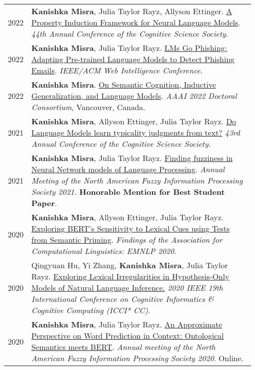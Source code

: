 \documentclass[11pt]{article}
\begin{document}
\begin{longtable}{p{}  p{} }
2022 & \textbf{Kanishka Misra}, Julia Taylor Rayz, Allyson Ettinger. \href{https://escholarship.org/uc/item/6170h6nj}{A Property Induction Framework for Neural Language Models}. \textit{44th Annual Conference of the Cognitive Science Society}.\\

2022 & \textbf{Kanishka Misra}, Julia Taylor Rayz. \href{https://ieeexplore.ieee.org/document/10101955}{LMs Go Phishing: Adapting Pre-trained Language Models to Detect Phishing Emails}. \textit{IEEE/ACM Web Intelligence Conference}.\\

2022 & \textbf{Kanishka Misra}. \href{https://ojs.aaai.org/index.php/AAAI/article/view/21584}{On Semantic Cognition, Inductive Generalization, and Language Models}. \textit{AAAI 2022 Doctoral Consortium}, Vancouver, Canada.\\

2021 & \textbf{Kanishka Misra}, Allyson Ettinger, Julia Taylor Rayz. \href{https://escholarship.org/uc/item/9n77r9mr#main}{Do Language Models learn typicality judgments from text?} \textit{43rd Annual Conference of the Cognitive Science Society.}\\

2021 & \textbf{Kanishka Misra}, Julia Taylor Rayz. \href{http://kanishka.website/papers/nafips21.pdf}{Finding fuzziness in Neural Network models of Language Processing}. \textit{Annual Meeting of the North American Fuzzy Information Processing Society 2021.} \textcolor{award}{\textbf{Honorable Mention for Best Student Paper}}.\\

2020 & \textbf{Kanishka Misra}, Allyson Ettinger, Julia Taylor Rayz. \href{http://dx.doi.org/10.18653/v1/2020.findings-emnlp.415}{Exploring BERT's Sensitivity to Lexical Cues using Tests from Semantic Priming}. \textit{Findings of the Association for Computational Linguistics: EMNLP 2020}.\\

2020 & Qingyuan Hu, Yi Zhang, \textbf{Kanishka Misra}, Julia Taylor Rayz. \href{https://arxiv.org/abs/2101.07397}{Exploring Lexical Irregularities in Hypothesis-Only Models of Natural Language Inference.}  \textit{2020 IEEE 19th International Conference on Cognitive Informatics \& Cognitive Computing (ICCI* CC)}.\\

2020 & \textbf{Kanishka Misra}, Julia Taylor Rayz. \href{https://kanishka.website/papers/nafips.pdf}{An Approximate Perspective on Word Prediction in Context: Ontological Semantics meets BERT}. \textit{Annual meeting of the North American Fuzzy Information Processing Society 2020}. Online.\\


\end{longtable}
\end{document}
